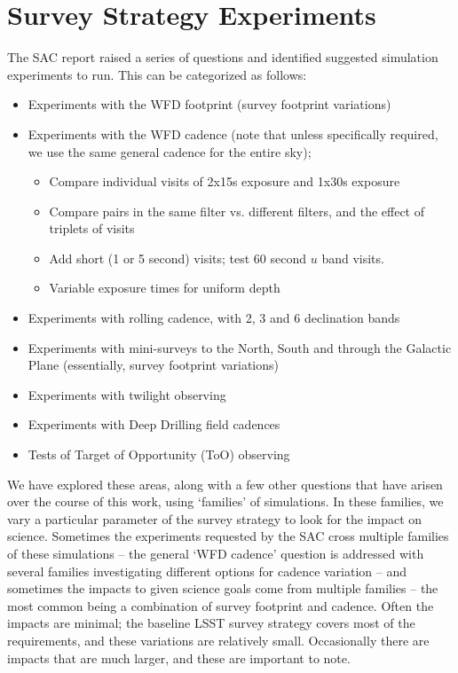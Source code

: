 \section{Survey Strategy Experiments} 

The SAC report raised a series of questions and identified suggested simulation experiments to run. This can be categorized as follows: 
\begin{itemize}
\item Experiments with the WFD footprint (survey footprint variations)
\item Experiments with the WFD cadence (note that unless specifically required, we use the same general cadence for the entire sky);
	\begin{itemize}
	\item Compare individual visits of 2x15s exposure and 1x30s exposure
	\item Compare pairs in the same filter vs. different filters, and the effect of triplets of visits
	\item Add short (1 or 5 second) visits; test 60 second $u$ band visits.
	\item Variable exposure times for uniform depth
	\end{itemize}
\item Experiments with rolling cadence, with 2, 3 and 6 declination bands
\item Experiments with mini-surveys to the North, South and through the Galactic Plane (essentially, survey footprint variations)
\item Experiments with twilight observing
\item Experiments with Deep Drilling field cadences 
\item Tests of Target of Opportunity (ToO) observing
\end{itemize}

We have explored these areas, along with a few other questions that have arisen over the course of this work, using `families' of simulations. In these families, we vary a particular parameter of the survey strategy to look for the impact on science. Sometimes the experiments requested by the SAC cross multiple families of these simulations  -- the general `WFD cadence' question is addressed with several families investigating different options for cadence variation -- and sometimes the impacts to given science goals come from multiple families -- the most common being a combination of survey footprint and cadence. Often the impacts are minimal; the baseline LSST survey strategy covers most of the requirements, and these variations are relatively small. Occasionally there are impacts that are much larger, and these are important to note. 

